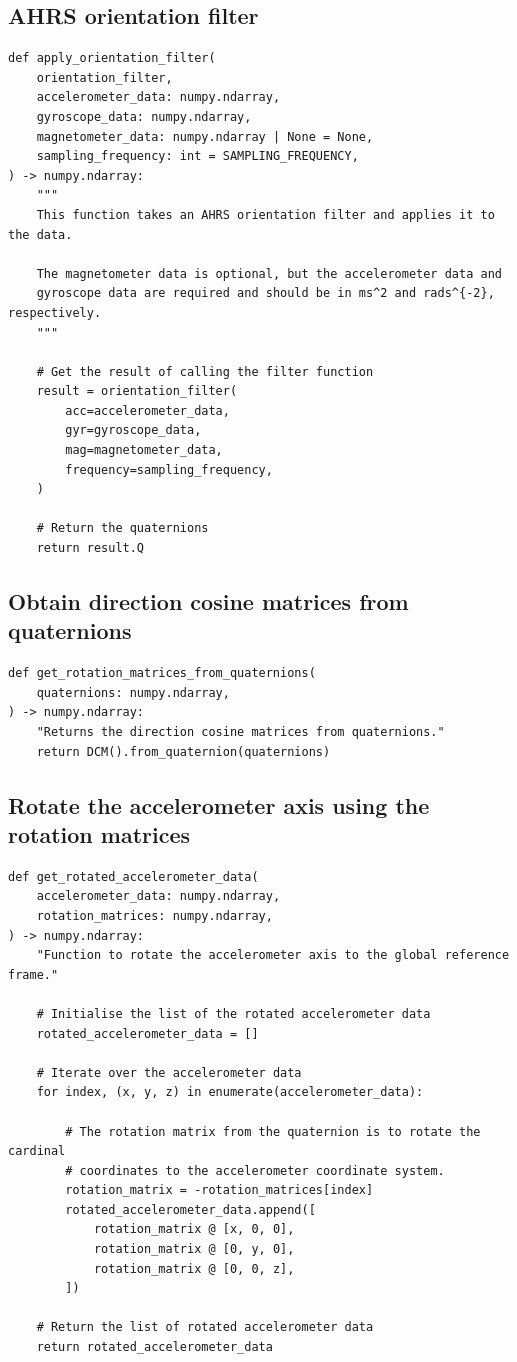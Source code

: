\documentclass[12pt]{report}
\begin{document}
\subsection{AHRS orientation filter}
\label{sec:org2331e79}
\begin{verbatim}
def apply_orientation_filter(
    orientation_filter,
    accelerometer_data: numpy.ndarray,
    gyroscope_data: numpy.ndarray,
    magnetometer_data: numpy.ndarray | None = None,
    sampling_frequency: int = SAMPLING_FREQUENCY,
) -> numpy.ndarray:
    """
    This function takes an AHRS orientation filter and applies it to the data.

    The magnetometer data is optional, but the accelerometer data and
    gyroscope data are required and should be in ms^2 and rads^{-2}, respectively.
    """

    # Get the result of calling the filter function
    result = orientation_filter(
        acc=accelerometer_data,
        gyr=gyroscope_data,
        mag=magnetometer_data,
        frequency=sampling_frequency,
    )

    # Return the quaternions
    return result.Q
\end{verbatim}
\subsection{Obtain direction cosine matrices from quaternions}
\label{sec:orgd354fe0}
\begin{verbatim}
def get_rotation_matrices_from_quaternions(
    quaternions: numpy.ndarray,
) -> numpy.ndarray:
    "Returns the direction cosine matrices from quaternions."
    return DCM().from_quaternion(quaternions)
\end{verbatim}
\subsection{Rotate the accelerometer axis using the rotation matrices}
\label{sec:org140b0ad}
\begin{verbatim}
def get_rotated_accelerometer_data(
    accelerometer_data: numpy.ndarray,
    rotation_matrices: numpy.ndarray,
) -> numpy.ndarray:
    "Function to rotate the accelerometer axis to the global reference frame."

    # Initialise the list of the rotated accelerometer data
    rotated_accelerometer_data = []

    # Iterate over the accelerometer data
    for index, (x, y, z) in enumerate(accelerometer_data):

        # The rotation matrix from the quaternion is to rotate the cardinal
        # coordinates to the accelerometer coordinate system.
        rotation_matrix = -rotation_matrices[index]
        rotated_accelerometer_data.append([
            rotation_matrix @ [x, 0, 0],
            rotation_matrix @ [0, y, 0],
            rotation_matrix @ [0, 0, z],
        ])

    # Return the list of rotated accelerometer data
    return rotated_accelerometer_data
\end{verbatim}
\end{document}
